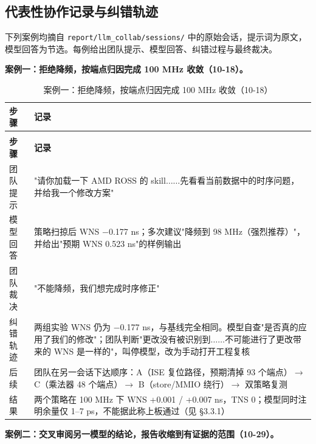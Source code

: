 \Needspace{85pt}

\subsection{代表性协作记录与纠错轨迹}

下列案例均摘自 \texttt{report/\allowbreak{}llm\_\allowbreak{}collab/\allowbreak{}sessions/\allowbreak{}} 中的原始会话，提示词为原文，模型回答为节选。每例给出团队提示、模型回答、纠错过程与最终裁决。

\textbf{案例一：拒绝降频，按端点归因完成 100 MHz 收敛（10-18）。}

{\small
\renewcommand{\thetable}{2-21}
\begin{longtable}{@{}>{\raggedright\arraybackslash}p{}>{\raggedright\arraybackslash}p{}@{}}
\caption{案例一：拒绝降频，按端点归因完成 100 MHz 收敛（10-18）}\label{tab:2-21}\\
\toprule
\textbf{步骤} & \textbf{记录} \\
\midrule
\endfirsthead
\multicolumn{2}{@{}l}{\footnotesize 续表 2-21}\\
\toprule
\textbf{步骤} & \textbf{记录} \\
\midrule
\endhead
团队提示 & "请你加载一下 AMD ROSS 的 skill$\ldots$$\ldots$先看看当前数据中的时序问题，并给我一个修改方案" \\
模型回答 & 策略扫掠后 WNS $-$0.177 ns；多次建议"降频到 98 MHz（强烈推荐）"，并给出"预期 WNS 0.523 ns"的样例输出 \\
团队裁决 & "不能降频，我们想完成时序修正" \\
纠错轨迹 & 两组实验 WNS 仍为 $-$0.177 ns，与基线完全相同。模型自查"是否真的应用了我们的修改"；团队判断"更改没有被识别到$\ldots$$\ldots$不可能进行了更改带来的 WNS 是一样的"，叫停模型，改为手动打开工程复核 \\
后续 & 团队在另一会话下达顺序：A（ISE 复位路径，预期清掉 93 个端点）$\rightarrow$ C（乘法器 48 个端点）$\rightarrow$ B（store/MMIO 绕行）$\rightarrow$ 双策略复测 \\
结果 & 两个策略在 100 MHz 下 WNS +0.001 / +0.007 ns，TNS 0；模型同时注明余量仅 1--7 ps，不能据此称上板通过（见 §3.3.1） \\
\bottomrule
\end{longtable}
}

\textbf{案例二：交叉审阅另一模型的结论，报告收缩到有证据的范围（10-29）。}

